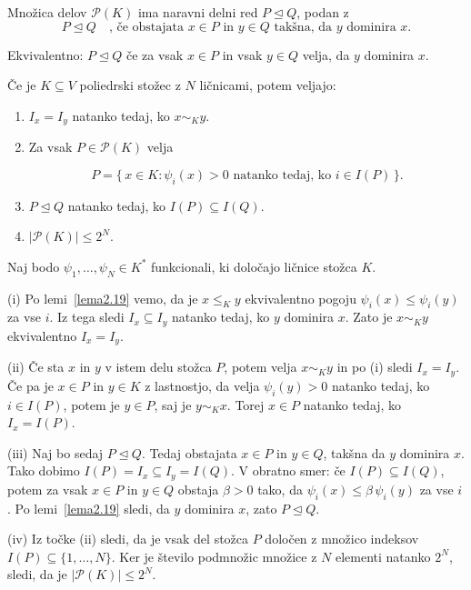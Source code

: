 \documentclass[mat2, tisk]{fmfdelo}
\begin{document}
Množica delov \(\mathcal{P}(K)\) ima naravni delni red \(P \trianglelefteq Q\), podan z
\[
P \trianglelefteq Q
\quad \text{, če obstajata } x\in P \text{ in } y\in Q \text{ takšna, da }
y \text{ dominira } x.
\]

Ekvivalentno: \(P \trianglelefteq Q\) če za vsak \(x\in P\) in vsak \(y\in Q\)
velja, da \(y\) dominira \(x\).

\begin{lema}\label{lema2.38}
Če je \(K\subseteq V\) poliedrski stožec z \(N\) ličnicami, potem veljajo:
\begin{enumerate}[label= (\roman*)]
\item \(I_x=I_y\) natanko tedaj, ko \(x\sim_K y\).
\item Za vsak \(P\in\mathcal{P}(K)\) velja

\[
P=\{\, x\in K : \psi_i(x)>0 \text{ natanko tedaj, ko } i\in I(P) \,\}.
\]


\item \(P\trianglelefteq Q\) natanko tedaj, ko \(I(P)\subseteq I(Q)\).
\item \(|\mathcal{P}(K)|\le 2^N\).
\end{enumerate}
\end{lema}

\begin{dokaz}
Naj bodo \(\psi_1,\ldots,\psi_N\in K^*\) funkcionali, ki določajo ličnice stožca
\(K\). 

(i) Po lemi~\ref{lema2.19} vemo, da je \(x\le_K y\) ekvivalentno pogoju
      \(\psi_i(x)\le\psi_i(y)\) za vse \(i\). Iz tega sledi
      $I_x\subseteq I_y$ natanko tedaj, ko $y$ dominira $x$.
      Zato je \(x\sim_K y\) ekvivalentno \(I_x=I_y\). 

(ii) Če sta $x$ in $y$ v istem delu stožca $P$, potem velja $x \sim_K y$ in po (i) sledi $I_x = I_y$. 
      Če pa je $x \in P$ in $y \in K$ z lastnostjo, da velja $\psi_i(y) > 0$ natanko tedaj, ko 
      $i \in I(P)$, potem je $y \in P$, saj je $y \sim_K x$. Torej $x\in P$ natanko tedaj, ko $I_x=I(P)$.

(iii) 
      Naj bo sedaj \(P\trianglelefteq Q\). Tedaj obstajata \(x\in P\) in \(y\in Q\), takšna da
      \(y\) dominira \(x\). Tako dobimo $I(P)=I_x\subseteq I_y=I(Q)$.
      V obratno smer: če \(I(P)\subseteq I(Q)\), potem za vsak \(x\in P\) in \(y\in Q\) obstaja
      \(\beta>0\) tako, da $\psi_i(x)\le \beta\,\psi_i(y)$ za vse $i$.
      Po lemi~\ref{lema2.19} sledi, da \(y\) dominira \(x\), zato \(P\trianglelefteq Q\). 
      
(iv)      
      Iz točke (ii) sledi, da je vsak del stožca \(P\) določen z množico indeksov \(I(P)\subseteq\{1,\ldots,N\}\).
      Ker je število podmnožic množice z \(N\) elementi natanko \(2^N\), sledi, da je \(|\mathcal{P}(K)|\le 2^N\).
\end{dokaz}
\end{document}
